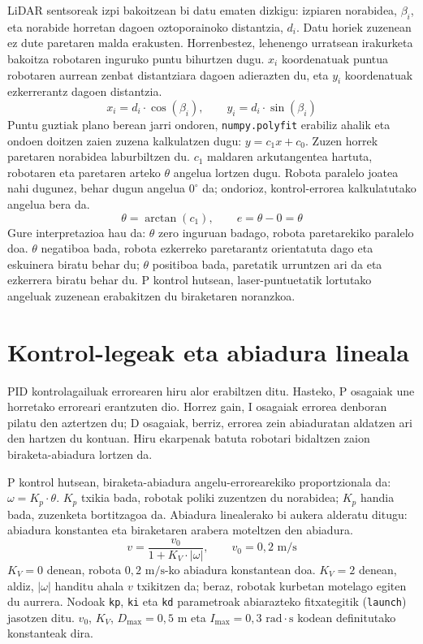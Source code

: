 LiDAR sentsoreak izpi bakoitzean bi datu ematen dizkigu: izpiaren norabidea, $\beta_i$, eta norabide horretan dagoen oztoporainoko distantzia, $d_i$. Datu horiek zuzenean ez dute paretaren malda erakusten. Horrenbestez, lehenengo urratsean irakurketa bakoitza robotaren inguruko puntu bihurtzen dugu. $x_i$ koordenatuak puntua robotaren aurrean zenbat distantziara dagoen adierazten du, eta $y_i$ koordenatuak ezkerrerantz dagoen distantzia.
\[
  x_i = d_i \cdot \cos(\beta_i), \qquad y_i = d_i \cdot \sin(\beta_i)
\]
Puntu guztiak plano berean jarri ondoren, \texttt{numpy.polyfit} erabiliz ahalik eta ondoen doitzen zaien zuzena kalkulatzen dugu: $y = c_1 x + c_0$. Zuzen horrek paretaren norabidea laburbiltzen du. $c_1$ maldaren arkutangentea hartuta, robotaren eta paretaren arteko $\theta$ angelua lortzen dugu. Robota paralelo joatea nahi dugunez, behar dugun angelua $0^\circ$ da; ondorioz, kontrol-errorea kalkulatutako angelua bera da.
\[
  \theta = \arctan(c_1), \qquad e = \theta - 0 = \theta
\]
Gure interpretazioa hau da: $\theta$ zero inguruan badago, robota paretarekiko paralelo doa. $\theta$ negatiboa bada, robota ezkerreko paretarantz orientatuta dago eta eskuinera biratu behar du; $\theta$ positiboa bada, paretatik urruntzen ari da eta ezkerrera biratu behar du. P kontrol hutsean, laser-puntuetatik lortutako angeluak zuzenean erabakitzen du biraketaren noranzkoa.

\clearpage
\enlargethispage{2\baselineskip}
\section{Kontrol-legeak eta abiadura lineala}\label{sec:kontrol-legeak}
PID kontrolagailuak errorearen hiru alor erabiltzen ditu. Hasteko, P osagaiak une horretako erroreari erantzuten dio. Horrez gain, I osagaiak errorea denboran pilatu den aztertzen du; D osagaiak, berriz, errorea zein abiaduratan aldatzen ari den hartzen du kontuan. Hiru ekarpenak batuta robotari bidaltzen zaion biraketa-abiadura lortzen da.

P kontrol hutsean, biraketa-abiadura angelu-errorearekiko proportzionala da: $\omega = K_p \cdot \theta$. $K_p$ txikia bada, robotak poliki zuzentzen du norabidea; $K_p$ handia bada, zuzenketa bortitzagoa da. Abiadura linealerako bi aukera alderatu ditugu: abiadura konstantea eta biraketaren arabera moteltzen den abiadura.
\[
  v = \frac{v_0}{1 + K_V \cdot |\omega|}, \qquad v_0 = 0{,}2\text{ m/s}
\]
$K_V = 0$ denean, robota $0{,}2\text{ m/s}$-ko abiadura konstantean doa. $K_V = 2$ denean, aldiz, $|\omega|$ handitu ahala $v$ txikitzen da; beraz, robotak kurbetan motelago egiten du aurrera. Nodoak \texttt{kp}, \texttt{ki} eta \texttt{kd} parametroak abiarazteko fitxategitik (\texttt{launch}) jasotzen ditu. $v_0$, $K_V$, $D_{\max} = 0{,}5\text{ m}$ eta $I_{\max} = 0{,}3\text{ rad}\cdot\text{s}$ kodean definitutako konstanteak dira.

